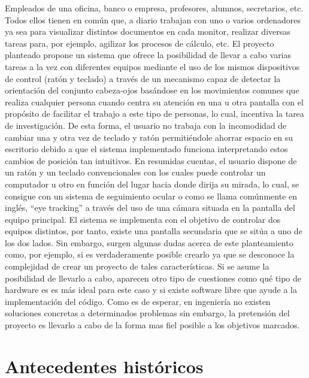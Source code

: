 Empleados de una oficina, banco o empresa, profesores, alumnos, secretarios, etc. Todos ellos tienen en común que, a diario trabajan con uno o varios ordenadores ya sea para visualizar distintos documentos en cada monitor, realizar diversas tareas para, por ejemplo, agilizar los procesos de cálculo, etc. El proyecto planteado propone un sistema que ofrece la posibilidad de llevar a cabo varias tareas a la vez con diferentes equipos mediante el uso de los mismos dispositivos de control (ratón y teclado) a través de un mecanismo capaz de detectar la orientación del conjunto cabeza-ojos basándose en los movimientos comunes que realiza cualquier persona cuando centra su atención en una u otra pantalla con el propósito de facilitar el trabajo a este tipo de personas, lo cual, incentiva la tarea de investigación. De esta forma, el usuario no trabaja con la incomodidad  de cambiar una y otra vez de teclado y ratón permitiéndole ahorrar espacio en su escritorio debido a que el sistema implementado funciona interpretando estos cambios de posición tan intuitivos. En resumidas cuentas, el usuario dispone de un ratón y un teclado convencionales con los cuales puede controlar un computador u otro en función del lugar hacia donde dirija su mirada, lo cual, se consigue con un sistema de seguimiento ocular o como se llama comúnmente en inglés, ``eye tracking'' a través del uso de una cámara situada en la pantalla del equipo principal. El sistema se implementa con el objetivo de controlar dos equipos distintos, por tanto, existe una pantalla secundaria que se sitúa a uno de los dos lados. Sin embargo, surgen algunas dudas acerca de este planteamiento como, por ejemplo, si es verdaderamente posible crearlo ya que se desconoce la complejidad de crear un proyecto de tales características. Si se asume la posibilidad de llevarlo a cabo, aparecen otro tipo de cuestiones como qué tipo de hardware es es más ideal para este caso y si existe software libre que ayude a la implementación del código. Como es de esperar, en ingeniería no existen soluciones concretas a determinados problemas sin embargo, la pretensión del proyecto es llevarlo a cabo de la forma mas fiel posible a los objetivos marcados.

\clearpage


\section{Antecedentes históricos} \label{s1_2}

